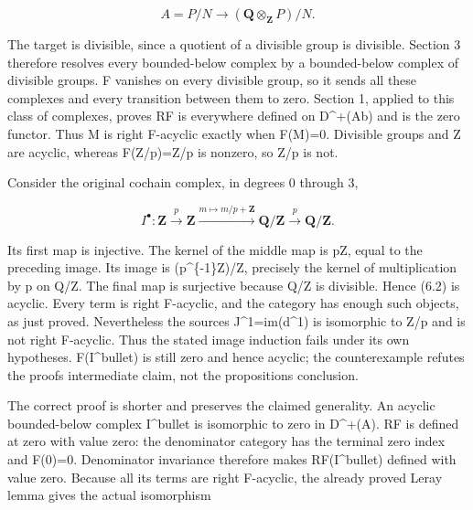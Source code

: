 \[
 A=P/N\longrightarrow (\mathbf Q\otimes_{\mathbf Z}P)/N.
\]

The target is divisible,\allowbreak{} since a quotient of a divisible group is divisible. Section 3 therefore resolves every bounded-below complex by a bounded-below complex of divisible groups. F vanishes on every divisible group,\allowbreak{} so it sends all these complexes and every transition between them to zero. Section 1,\allowbreak{} applied to this class of complexes,\allowbreak{} proves RF is everywhere defined on D\textasciicircum{}\allowbreak{}+(Ab)\allowbreak{} and is the zero functor. Thus M is right F-acyclic exactly when F(M)\allowbreak{}\allowbreak{}=0. Divisible groups and Z are acyclic,\allowbreak{} whereas F(Z/\allowbreak{}p)\allowbreak{}\allowbreak{}=Z/\allowbreak{}p is nonzero,\allowbreak{} so Z/\allowbreak{}p is not.

Consider the original cochain complex,\allowbreak{} in degrees 0 through 3,\allowbreak{}

\[
 I^\bullet:
 \mathbf Z\xrightarrow{\,p\,}\mathbf Z
 \xrightarrow{m\mapsto m/p+\mathbf Z}\mathbf Q/\mathbf Z
 \xrightarrow{\,p\,}\mathbf Q/\mathbf Z.                   \tag{6.2}
\]

Its first map is injective. The kernel of the middle map is pZ,\allowbreak{} equal to the preceding image. Its image is (p\textasciicircum{}\{-1\}Z)\allowbreak{}/\allowbreak{}Z,\allowbreak{} precisely the kernel of multiplication by p on Q/\allowbreak{}Z. The final map is surjective because Q/\allowbreak{}Z is divisible. Hence (6.2)\allowbreak{} is acyclic. Every term is right F-acyclic,\allowbreak{} and the category has enough such objects,\allowbreak{} as just proved. Nevertheless the source\textquotesingle s J\textasciicircum{}1\allowbreak{}=im(d\textasciicircum{}1)\allowbreak{} is isomorphic to Z/\allowbreak{}p and is not right F-acyclic. Thus the stated image induction fails under its own hypotheses. F(I\textasciicircum{}bullet)\allowbreak{} is still zero and hence acyclic; the counterexample refutes the proof\textquotesingle s intermediate claim,\allowbreak{} not the proposition\textquotesingle s conclusion.

The correct proof is shorter and preserves the claimed generality. An acyclic bounded-below complex I\^{}bullet is isomorphic to zero in D\textasciicircum{}\allowbreak{}+(A)\allowbreak{}. RF is defined at zero with value zero:\allowbreak{} the denominator category has the terminal zero index and F(0)\allowbreak{}\allowbreak{}=0. Denominator invariance therefore makes RF(I\textasciicircum{}bullet)\allowbreak{} defined with value zero. Because all its terms are right F-acyclic,\allowbreak{} the already proved Leray lemma gives the actual isomorphism

